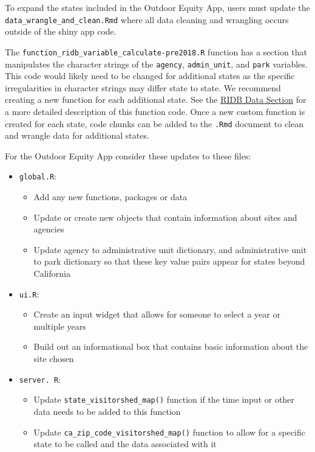\documentclass[
  11 pt,
  openany]{book}
\providecommand{\tightlist}{%
  \setlength{\itemsep}{0pt}\setlength{\parskip}{0pt}}
\begin{document}
To expand the states included in the Outdoor Equity App, users must update the \texttt{data\_wrangle\_and\_clean.Rmd} where all data cleaning and wrangling occurs outside of the shiny app code.

The \texttt{function\_ridb\_variable\_calculate-pre2018.R} function has a section that manipulates the character strings of the \texttt{agency}, \texttt{admin\_unit}, and \texttt{park} variables. This code would likely need to be changed for additional states as the specific irregularities in character strings may differ state to state. We recommend creating a new function for each additional state. See the \protect\hyperlink{ridb-data}{RIDB Data Section} for a more detailed description of this function code. Once a new custom function is created for each state, code chunks can be added to the \texttt{.Rmd} document to clean and wrangle data for additional states.

For the Outdoor Equity App consider these updates to these files:

\begin{itemize}
\item
  \texttt{global.R}:

  \begin{itemize}
  \tightlist
  \item
    Add any new functions, packages or data
  \item
    Update or create new objects that contain information about sites and agencies
  \item
    Update agency to administrative unit dictionary, and administrative unit to park dictionary so that these key value pairs appear for states beyond California
  \end{itemize}
\item
  \texttt{ui.R}:

  \begin{itemize}
  \tightlist
  \item
    Create an input widget that allows for someone to select a year or multiple years
  \item
    Build out an informational box that contains basic information about the site chosen
  \end{itemize}
\item
  \texttt{server.\ R}:

  \begin{itemize}
  \tightlist
  \item
    Update \texttt{state\_visitorshed\_map()} function if the time input or other data needs to be added to this function
  \item
    Update \texttt{ca\_zip\_code\_visitorshed\_map()} function to allow for a specific state to be called and the data associated with it
  \end{itemize}
\end{itemize}
\end{document}

